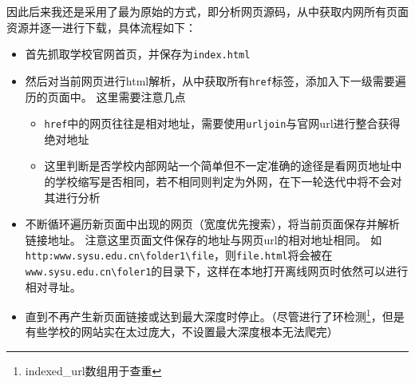 \documentclass[logo,reportComp]{thesis}
\begin{document}
因此后来我还是采用了最为原始的方式，即分析网页源码，从中获取内网所有页面资源并逐一进行下载，具体流程如下：
\begin{itemize}
  \item 首先抓取学校官网首页，并保存为\verb'index.html'
  \item 然后对当前网页进行html解析，从中获取所有\verb'href'标签，添加入下一级需要遍历的页面中。
  这里需要注意几点
  \begin{itemize}
    \item \verb'href'中的网页往往是相对地址，需要使用\verb'urljoin'与官网url进行整合获得绝对地址
    \item 这里判断是否学校内部网站一个简单但不一定准确的途径是看网页地址中的学校缩写是否相同，若不相同则判定为外网，在下一轮迭代中将不会对其进行分析
  \end{itemize}
  \item 不断循环遍历新页面中出现的网页（宽度优先搜索），将当前页面保存并解析链接地址。
  注意这里页面文件保存的地址与网页url的相对地址相同。
  如\verb'http:www.sysu.edu.cn\folder1\file'，则\verb'file.html'将会被在\verb'www.sysu.edu.cn\foler1'的目录下，这样在本地打开离线网页时依然可以进行相对寻址。
  \item 直到不再产生新页面链接或达到最大深度时停止。（尽管进行了环检测\footnote{indexed\_url数组用于查重}，但是有些学校的网站实在太过庞大，不设置最大深度根本无法爬完）
\end{itemize}
\end{document}
